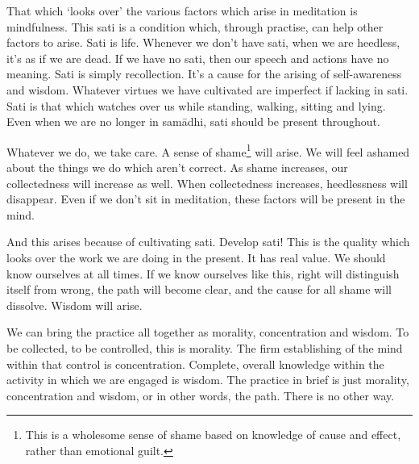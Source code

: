 That which `looks over' the various factors which arise in meditation is  mindfulness. This sati is a condition which, through practise, can help other factors to arise. Sati is life. Whenever we don't have sati, when we are heedless, it's as if we are dead. If we have no sati, then our speech and actions have no meaning. Sati is simply recollection. It's a cause for the arising of self-awareness and wisdom. Whatever virtues we have cultivated are imperfect if lacking in sati. Sati is that which watches over us while standing, walking, sitting and lying. Even when we are no longer in sam\=adhi, sati should be present throughout.

Whatever we do, we take care. A sense of shame\footnote{This is a wholesome sense of shame based on knowledge of cause and effect, rather than emotional guilt.} will arise. We will feel ashamed about the things we do which aren't correct. As shame increases, our collectedness will increase as well. When collectedness increases, heedlessness will disappear. Even if we don't sit in meditation, these factors will be present in the mind.

And this arises because of cultivating sati. Develop sati! This is the quality which looks over the work we are doing in the present. It has real value. We should know ourselves at all times. If we know ourselves like this, right will distinguish itself from wrong, the path will become clear, and the cause for all shame will dissolve. Wisdom will arise.

We can bring the practice all together as morality, concentration and wisdom. To be collected, to be controlled, this is morality. The firm establishing of the mind within that control is concentration. Complete, overall knowledge within the activity in which we are engaged is wisdom. The practice in brief is just morality, concentration and wisdom, or in other words, the path. There is no other way.
